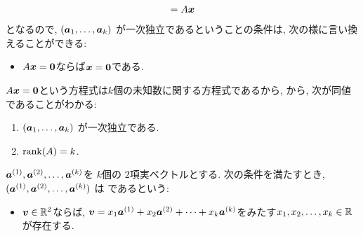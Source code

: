 \begin{remark}
\begin{align*}
    =A\boldsymbol{x}
  \end{align*}
  となるので,
  $(\boldsymbol{a}_1,\ldots, \boldsymbol{a}_k)$
  が一次独立であるということの条件は, 次の様に言い換えることができる:
  \begin{itemize}
  \item $A\boldsymbol{x}=\boldsymbol{0}$ならば$\boldsymbol{x}=\boldsymbol{0}$である.
  \end{itemize}
  $A\boldsymbol{x}=\boldsymbol{0}$という方程式は$k$個の未知数に関する方程式であるから,
  から,
  次が同値であることがわかる:
  \begin{enumerate}
  \item
    $(\boldsymbol{a}_1,\ldots, \boldsymbol{a}_k)$
    が一次独立である.
  \item
    $\operatorname{rank}(A)=k$.
  \end{enumerate}
\end{remark}

\begin{definition}
  $\boldsymbol{a}^{(1)},\boldsymbol{a}^{(2)},\ldots,\boldsymbol{a}^{(k)}$を
  $k$個の
  $2$項実ベクトルとする.
  次の条件を満たすとき,
  $(\boldsymbol{a}^{(1)},\boldsymbol{a}^{(2)},\ldots,\boldsymbol{a}^{(k)})$
  は
  であるという:
  \begin{itemize}
  \item
    $\boldsymbol{v}\in\mathbb{R}^2$ならば,
    $\boldsymbol{v}=x_1\boldsymbol{a}^{(1)}+x_2\boldsymbol{a}^{(2)}+\cdots+x_k\boldsymbol{a}^{(k)}$をみたす$x_1,x_2,\ldots,x_k\in\mathbb{R}$が存在する.
  \end{itemize}
\end{definition}

